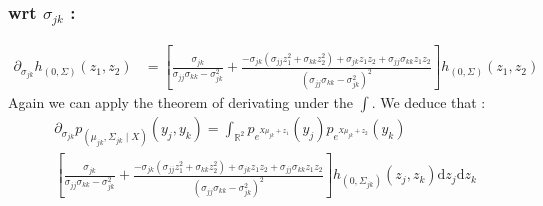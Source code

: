 \documentclass[11pt, a4paper]{article}
\begin{document}
\subsubsection{wrt $\sigma_{jk}$ :}
\begin{align*}
\partial_{\sigma_{jk}}h_{(0,\Sigma)}(z_1,z_2) &= [\frac{\sigma_{jk}}{\sigma_{jj} \sigma_{kk} - \sigma_{jk}^2} + \frac{-\sigma_{jk} ( \sigma_{jj} z_1^2 + \sigma_{kk} z_2^2 ) + \sigma_{jk} z_1 z_2 + \sigma_{jj} \sigma_{kk} z_1 z_2}{(\sigma_{jj} \sigma_{kk} - \sigma_{jk}^2)^2}] h_{(0,\Sigma)}(z_1,z_2)
\end{align*}
Again we can apply the theorem of derivating under the $\int$. We deduce that :
\begin{align*}
&\partial_{\sigma_{jk}}p_{(\mu_{jk},\Sigma_{jk} \mid X)}(y_j,y_k) =
\int_{\mathbb{R}^2} p_{e^{X\mu_{jk}+z_1}}(y_j) p_{e^{X\mu_{jk}+z_2}}(y_k)\\
&[   \frac{\sigma_{jk}}{\sigma_{jj} \sigma_{kk} - \sigma_{jk}^2} + \frac{-\sigma_{jk} ( \sigma_{jj} z_1^2 + \sigma_{kk} z_2^2 ) + \sigma_{jk} z_1 z_2 + \sigma_{jj} \sigma_{kk} z_1 z_2}{(\sigma_{jj} \sigma_{kk} - \sigma_{jk}^2)^2}] h_{(0,\Sigma_{jk})}(z_j,z_k) \mathrm{d}z_j \mathrm{d}z_k
\end{align*}
\end{document}
